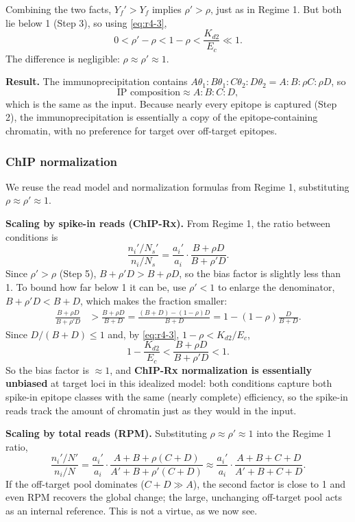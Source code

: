 Combining the two facts, $Y_f'>Y_f$ implies $\rho'>\rho$, just as in
Regime 1. But both lie below 1 (Step 3), so using \eqref{eq:r4-3},
$$
0<\rho'-\rho<1-\rho<\frac{K_{d2}}{E_c}\ll1.
$$
The difference is negligible: $\rho\approx\rho'\approx1$.

\textbf{Result.} The immunoprecipitation contains
$A\theta_1:B\theta_1:C\theta_2:D\theta_2=A:B:\rho C:\rho D$, so
$$
\text{IP composition}\approx A:B:C:D,
$$
which is the same as the input. Because nearly every epitope is captured
(Step 2), the immunoprecipitation is essentially a copy of the
epitope-containing chromatin, with no preference for target over
off-target epitopes.

\subsubsection{ChIP normalization}

We reuse the read model and normalization formulas from Regime 1,
substituting $\rho\approx\rho'\approx1$.

\textbf{Scaling by spike-in reads (ChIP-Rx).} From Regime 1, the ratio
between conditions is
$$
\frac{n_i'/N_s'}{n_i/N_s}
=\frac{a_i'}{a_i}\cdot\frac{B+\rho D}{B+\rho' D}.
$$
Since $\rho'>\rho$ (Step 5), $B+\rho'D>B+\rho D$, so the bias factor is
slightly less than 1. To bound how far below 1 it can be, use
$\rho'<1$ to enlarge the denominator, $B+\rho'D<B+D$, which makes the
fraction smaller:
$$\begin{aligned}
\frac{B+\rho D}{B+\rho' D}
&>\frac{B+\rho D}{B+D}
=\frac{(B+D)-(1-\rho)D}{B+D}
=1-(1-\rho)\frac{D}{B+D}.
\end{aligned}$$
Since $D/(B+D)\le1$ and, by \eqref{eq:r4-3}, $1-\rho<K_{d2}/E_c$,
$$
1-\frac{K_{d2}}{E_c}<\frac{B+\rho D}{B+\rho' D}<1.
$$
So the bias factor is $\approx1$, and \textbf{ChIP-Rx normalization is
essentially unbiased} at target loci in this idealized model: both
conditions capture both spike-in epitope classes with the same (nearly
complete) efficiency, so the spike-in reads track the amount of chromatin
just as they would in the input.

\textbf{Scaling by total reads (RPM).} Substituting $\rho\approx\rho'\approx1$
into the Regime 1 ratio,
$$
\frac{n_i'/N'}{n_i/N}
=\frac{a_i'}{a_i}\cdot\frac{A+B+\rho(C+D)}{A'+B+\rho'(C+D)}
\approx\frac{a_i'}{a_i}\cdot\frac{A+B+C+D}{A'+B+C+D}.
$$
If the off-target pool dominates ($C+D\gg A$), the second factor is
close to 1 and even RPM recovers the global change; the large,
unchanging off-target pool acts as an internal reference. This is not a
virtue, as we now see.

